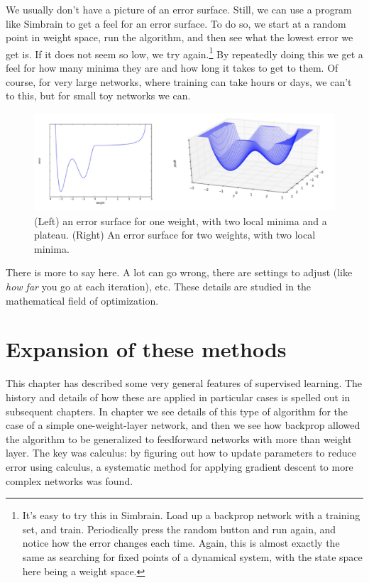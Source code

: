 We usually don't have a picture of an error surface. Still, we can use a program like Simbrain to get a feel for an error surface. To do so, we start at a random point in weight space, run the algorithm, and then see what the lowest error we get is. If it does not seem so low, we try again.\footnote{It's easy to try this in Simbrain. Load up a backprop network with a training set, and train. Periodically press the random button and run again, and notice how the error changes each time. Again, this is almost exactly the same as searching for fixed points of a dynamical system,  with the state space here being a weight space.} By repeatedly doing this we get a feel for how many minima they are and how long it takes to get to them. Of course, for very  large networks, where training can take hours or days, we can't to this, but for small toy networks we can.

\begin{figure}[h]
\centering
\includegraphics[scale=.4]{./images/LocalMinima1d2d.png}
\caption[Jeff Yoshimi and Scott Hotton.]{(Left) an error surface for one weight, with two local minima and a plateau. (Right) An error surface for two weights, with two local minima.}
\label{local_minima}
\end{figure}

 There is more to say here. A lot can go wrong, there are settings to adjust (like \emph{how far} you go at each iteration), etc. These details are studied in the mathematical field of optimization. 
 
 \section{Expansion of these methods}
 
 This chapter has described some very general features of supervised learning. The history and details of how these are applied in particular cases is spelled out in subsequent chapters.  In chapter  we see details of this type of algorithm for the case of a simple one-weight-layer network, and then we see how backprop allowed the algorithm to be generalized to feedforward networks with more than weight layer. The key was calculus: by figuring out how to update parameters to reduce error using calculus, a systematic method for applying gradient descent to more complex networks was found.
 
